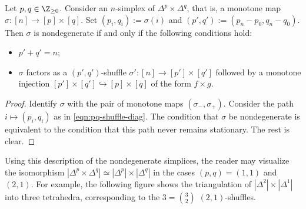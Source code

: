 \begin{proposition}
	Let $p,q\in\Z_{\geq0}$. Consider an $n$-simplex of
	$\Delta^p\times\Delta^q$, that is, a monotone map
	$\sigma:[n]\to[p]\times[q]$. Set $(p_i,q_i):=\sigma(i)$ and
	$(p',q'):=(p_n-p_0,q_n-q_0)$. Then $\sigma$ is nondegenerate if and only if
	the following conditions hold:
	\begin{itemize}
		\item $p'+q'=n$;
		\item $\sigma$ factors as a $(p',q')$-shuffle
		$\sigma':[n]\to[p']\times[q']$ followed by a monotone injection
		$[p']\times[q']\hookrightarrow[p]\times[q]$ of the form $f\times g$.
	\end{itemize}
\end{proposition}
\begin{proof}
	Identify $\sigma$ with the pair of monotone maps
	$(\sigma_-,\sigma_+)$. Consider the path $i\mapsto(p_i,q_i)$ as in
	\eqref{eqn:pq-shuffle-diag}. The condition that $\sigma$ be nondegenerate
	is equivalent to the condition that this path never remains stationary.
	The rest is clear.
\end{proof}

Using this description of the nondegenerate simplices, the reader may
visualize the isomorphism
$|\Delta^p\times\Delta^q|\simeq|\Delta^p|\times|\Delta^q|$ in the cases
$(p,q)=(1,1)$ and $(2,1)$. For example, the following figure shows the
triangulation of $|\Delta^2|\times|\Delta^1|$ into three tetrahedra,
corresponding to the $3=\binom{3}{2}$ $(2,1)$-shuffles.

